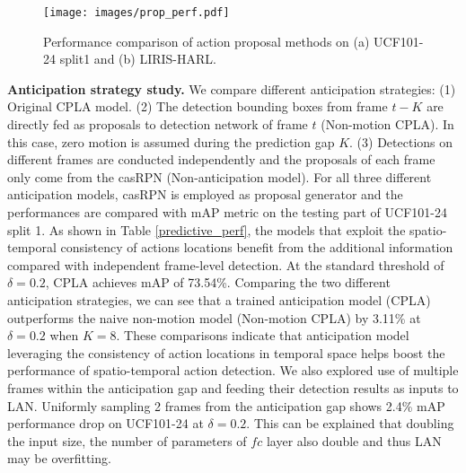 \documentclass{bmvc2k}
\begin{document}
\begin{figure}
\centering
\texttt{[image: images/prop\_perf.pdf]}
\caption{Performance comparison of action proposal methods on (a) UCF101-24 split1 and (b) LIRIS-HARL.}
\label{fig:prop_perf}
\end{figure}



\textbf{Anticipation strategy study.} We compare different anticipation strategies: (1) Original CPLA model. (2) The detection bounding boxes from frame $t-K$ are directly fed as proposals to detection network of frame $t$ (Non-motion CPLA). In this case, zero motion is assumed during the prediction gap $K$. (3) Detections on different frames are conducted independently and the proposals of each frame only come from the casRPN (Non-anticipation model). For all three different anticipation models, casRPN is employed as proposal generator and the performances are compared with mAP metric on the testing part of UCF101-24 split 1. As shown in Table \ref{predictive_perf}, the models that exploit the spatio-temporal consistency of actions locations benefit from the additional information compared with independent frame-level detection. At the standard threshold of $\delta = 0.2$, CPLA achieves mAP of 73.54\%. Comparing the two different anticipation strategies, we can see that a trained anticipation model (CPLA) outperforms the naive non-motion model (Non-motion CPLA) by 3.11\% at $\delta = 0.2$ when $K=8$. These comparisons indicate that anticipation model leveraging the consistency of action locations in temporal space helps boost the performance of spatio-temporal action detection. We also explored use of multiple frames within the anticipation gap and feeding their detection results as inputs to LAN. Uniformly sampling 2 frames from the anticipation gap shows 2.4\% mAP performance drop on UCF101-24 at $\delta=0.2$. This can be explained that doubling the input size, the number of parameters of $fc$ layer also double and thus LAN may be overfitting.
\end{document}
